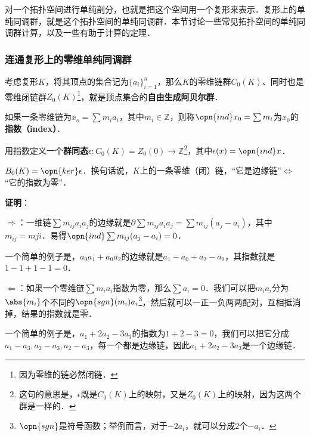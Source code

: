 



对一个拓扑空间进行单纯剖分，也就是把这个空间用一个复形来表示．复形上的单纯同调群，就是这个拓扑空间的单纯同调群．本节讨论一些常见拓扑空间的单纯同调群计算，以及一些有助于计算的定理．

\subsubsection{连通复形上的零维单纯同调群}

考虑复形$K$，将其顶点的集合记为$\{a_i\}_{i=1}^n$，那么$K$的零维链群$C_0(K)$、同时也是零维闭链群$Z_0(K)$\footnote{因为零维的链必然闭链．}，就是顶点集合的\textbf{自由生成阿贝尔群}．

如果一条零维链为$x_o=\sum m_ia_i$，其中$m_i\in\mathbb{Z}$，则称$\opn{ind} x_0=\sum m_i$为$x_0$的\textbf{指数（index）}．

用指数定义一个\textbf{群同态}$\epsilon: C_0(K)=Z_0(0)\to\mathbb{Z}$\footnote{这句的意思是，$\epsilon$既是$C_0(K)$上的映射，又是$Z_0(K)$上的映射，因为这两个群是一样的．}，其中$\epsilon(x)=\opn{ind} x$．

\begin{lemma}{}\label{SHCal_lem1}
$B_0(K)=\opn{ker}\epsilon$．换句话说，$K$上的一条零维（闭）链，“它是边缘链”$\iff$“它的指数为零”．
\end{lemma}

\textbf{证明}：

$\Rightarrow$：一维链$\sum m_{ij}a_ia_j$的边缘就是$\partial\sum m_{ij}a_ia_j=\sum m_{ij}(a_j-a_i)$，其中$m_{ij}=m{ji}$．易得$\opn{ind}\sum m_{ij}(a_j-a_i)=0$．

一个简单的例子是，$a_0a_1+a_0a_2$的边缘就是$a_1-a_0+a_2-a_0$，其指数就是$1-1+1-1=0$．


$\Leftarrow$：如果一个零维链$\sum m_ia_i$指数为零，那么$\sum a_i=0$．我们可以把$m_ia_i$分为$\abs{m_i}$个不同的$\opn{sgn}(m_i)a_i$\footnote{$\opn{sgn}$是符号函数；举例而言，对于$-2a_i$，就可以分成$2$个$-a_i$．}，然后就可以一正一负两两配对，互相抵消掉，结果的指数就是零．

一个简单的例子是，$a_1+2a_2-3a_3$的指数为$1+2-3=0$，我们可以把它分成$a_1-a_3, a_2-a_3, a_2-a_3$，每一个都是边缘链，因此$a_1+2a_2-3a_3$是一个边缘链．

